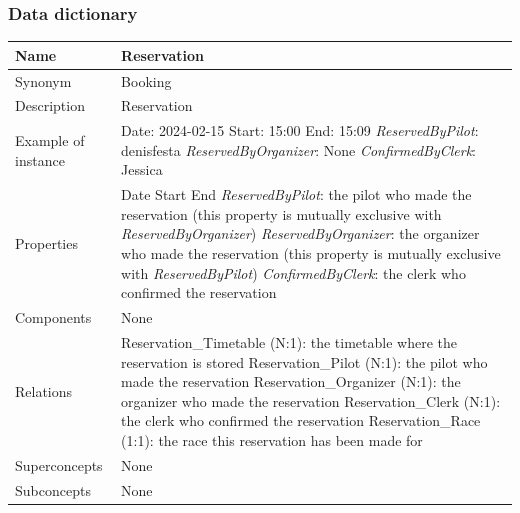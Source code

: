 \documentclass{beamer}
\begin{document}
\begin{frame}
\frametitle{Data dictionary}
\begin{table}
\tiny
\begin{tabular}{|p{2cm}|p{6cm}|}
\hline
Name & \textbf{Reservation} \\
\hline
Synonym & Booking \\
\hline
Description & Reservation \\
\hline
Example of instance &
Date: 2024-02-15 \newline
Start: 15:00 \newline
End: 15:09 \newline
\textit{ReservedByPilot}: denisfesta \newline
\textit{ReservedByOrganizer}: None \newline
\textit{ConfirmedByClerk}: Jessica \\
\hline
Properties &
Date \newline
Start \newline
End \newline
\textit{ReservedByPilot}: the pilot who made the reservation (this property 
is mutually exclusive with \textit{ReservedByOrganizer}) \newline
\textit{ReservedByOrganizer}: the organizer who made the reservation (this property
is mutually exclusive with \textit{ReservedByPilot}) \newline
\textit{ConfirmedByClerk}: the clerk who confirmed the reservation \\
\hline
Components & None \\
\hline
Relations &
Reservation\_Timetable (N:1): the timetable where the reservation is stored \newline
Reservation\_Pilot (N:1): the pilot who made the reservation \newline
Reservation\_Organizer (N:1): the organizer who made the reservation \newline
Reservation\_Clerk (N:1): the clerk who confirmed the reservation \newline
Reservation\_Race (1:1): the race this reservation has been made for \\
\hline
Superconcepts & None \\
\hline
Subconcepts & None \\
\hline
\end{tabular}
\end{table}
\end{frame}
\end{document}
